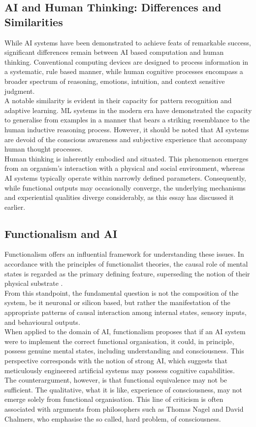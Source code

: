 \documentclass[runningheads]{llncs}
\begin{document}
\subsection{AI and Human Thinking: Differences and Similarities}
%
While AI systems have been demonstrated to achieve feats of remarkable success, significant differences remain between AI based computation and human thinking. Conventional computing devices are designed to process information in a systematic, rule based manner, while human cognitive processes encompass a broader spectrum of reasoning, emotions, intuition, and context sensitive judgment.
\\
A notable similarity is evident in their capacity for pattern recognition and adaptive learning. ML systems in the modern era have demonstrated the capacity to generalise from examples in a manner that bears a striking resemblance to the human inductive reasoning process. However, it should be noted that AI systems are devoid of the conscious awareness and subjective experience that accompany human thought processes.
\\
Human thinking is inherently embodied and situated. This phenomenon emerges from an organism's interaction with a physical and social environment, whereas AI systems typically operate within narrowly defined parameters. Consequently, while functional outputs may occasionally converge, the underlying mechanisms and experiential qualities diverge considerably, as this essay has discussed it earlier.
%
%
\subsection{Functionalism and AI}
%
Functionalism offers an influential framework for understanding these issues. In accordance with the principles of functionalist theories, the causal role of mental states is regarded as the primary defining feature, superseding the notion of their physical substrate 
\cite{russell}. 
\\
From this standpoint, the fundamental question is not the composition of the system, be it neuronal or silicon based, but rather the manifestation of the appropriate patterns of causal interaction among internal states, sensory inputs, and behavioural outputs.
\\
When applied to the domain of AI, functionalism proposes that if an AI system were to implement the correct functional organisation, it could, in principle, possess genuine mental states, including understanding and consciousness. This perspective corresponds with the notion of strong AI, which suggests that meticulously engineered artificial systems may possess cognitive capabilities.
\\
The counterargument, however, is that functional equivalence may not be sufficient. The qualitative, what it is like, experience of consciousness, may not emerge solely from functional organisation. This line of criticism is often associated with arguments from philosophers such as Thomas Nagel and David Chalmers, who emphasise the so called, hard problem, of consciousness.
%
%
\end{document}
